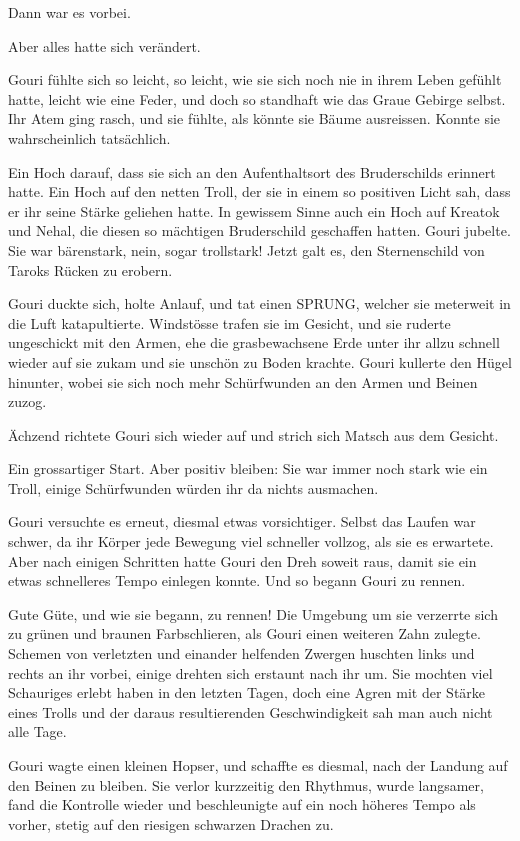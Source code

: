 Dann war es vorbei.

Aber alles hatte sich verändert.

Gouri fühlte sich so leicht, so leicht, wie sie sich noch nie in ihrem Leben gefühlt hatte, leicht wie eine Feder, und doch so standhaft wie das Graue Gebirge selbst. Ihr Atem ging rasch, und sie fühlte, als könnte sie Bäume ausreissen. Konnte sie wahrscheinlich tatsächlich.

Ein Hoch darauf, dass sie sich an den Aufenthaltsort des Bruderschilds erinnert hatte. Ein Hoch auf den netten Troll, der sie in einem so positiven Licht sah, dass er ihr seine Stärke geliehen hatte. In gewissem Sinne auch ein Hoch auf Kreatok und Nehal, die diesen so mächtigen Bruderschild geschaffen hatten. Gouri jubelte. Sie war bärenstark, nein, sogar trollstark! Jetzt galt es, den Sternenschild von Taroks Rücken zu erobern.

Gouri duckte sich, holte Anlauf, und tat einen SPRUNG, welcher sie meterweit in die Luft katapultierte. Windstösse trafen sie im Gesicht, und sie ruderte ungeschickt mit den Armen, ehe die grasbewachsene Erde unter ihr allzu schnell wieder auf sie zukam und sie unschön zu Boden krachte. Gouri kullerte den Hügel hinunter, wobei sie sich noch mehr Schürfwunden an den Armen und Beinen zuzog.

Ächzend richtete Gouri sich wieder auf und strich sich Matsch aus dem Gesicht.

Ein grossartiger Start. Aber positiv bleiben: Sie war immer noch stark wie ein Troll, einige Schürfwunden würden ihr da nichts ausmachen.

Gouri versuchte es erneut, diesmal etwas vorsichtiger. Selbst das Laufen war schwer, da ihr Körper jede Bewegung viel schneller vollzog, als sie es erwartete. Aber nach einigen Schritten hatte Gouri den Dreh soweit raus, damit sie ein etwas schnelleres Tempo einlegen konnte. Und so begann Gouri zu rennen.

Gute Güte, und wie sie begann, zu rennen! Die Umgebung um sie verzerrte sich zu grünen und braunen Farbschlieren, als Gouri einen weiteren Zahn zulegte. Schemen von verletzten und einander helfenden Zwergen huschten links und rechts an ihr vorbei, einige drehten sich erstaunt nach ihr um. Sie mochten viel Schauriges erlebt haben in den letzten Tagen, doch eine Agren mit der Stärke eines Trolls und der daraus resultierenden Geschwindigkeit sah man auch nicht alle Tage.

Gouri wagte einen kleinen Hopser, und schaffte es diesmal, nach der Landung auf den Beinen zu bleiben. Sie verlor kurzzeitig den Rhythmus, wurde langsamer, fand die Kontrolle wieder und beschleunigte auf ein noch höheres Tempo als vorher, stetig auf den riesigen schwarzen Drachen zu.


